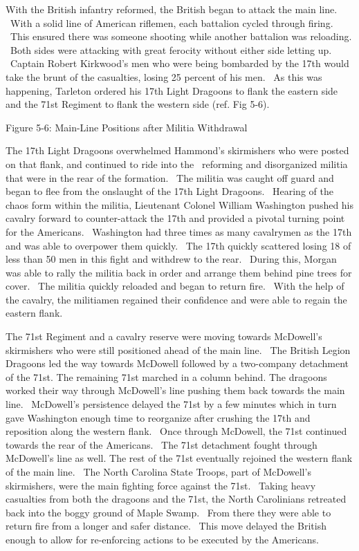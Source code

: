 With the British infantry reformed, the British began to attack the main line.
 With a solid line of American riflemen, each battalion cycled through firing.
 This ensured there was someone shooting while another battalion was reloading.
 Both sides were attacking with great ferocity without either side letting up.
 Captain Robert Kirkwood’s men who were being bombarded by the 17th would take
the brunt of the casualties, losing 25 percent of his men.  As this was
happening, Tarleton ordered his 17th Light Dragoons to flank the eastern side
and the 71st Regiment to flank the western side (ref. Fig 5-6).



Figure 5-6: Main-Line Positions after Militia Withdrawal
\cite[p.102]{babits_devil_2001}





The 17th Light Dragoons overwhelmed Hammond’s skirmishers who were posted on
that flank, and continued to ride into the  reforming and disorganized militia
that were in the rear of the formation.  The militia was caught off guard and
began to flee from the onslaught of the 17th Light Dragoons.  Hearing of the
chaos form within the militia, Lieutenant Colonel William Washington pushed his
cavalry forward to counter-attack the 17th and provided a pivotal turning point
for the Americans.  Washington had three times as many cavalrymen as the 17th
and was able to overpower them quickly.  The 17th quickly scattered losing 18 of
less than 50 men in this fight and withdrew to the rear.  During this, Morgan
was able to rally the militia back in order and arrange them behind pine trees
for cover.  The militia quickly reloaded and began to return fire.  With the
help of the cavalry, the militiamen regained their confidence and were able to
regain the eastern flank.

The 71st Regiment and a cavalry reserve were moving towards McDowell’s
skirmishers who were still positioned ahead of the main line.  The British
Legion Dragoons led the way towards McDowell followed by a two-company
detachment of the 71st.  The remaining 71st marched in a column behind.  The
dragoons worked their way through McDowell’s line pushing them back towards the
main line.  McDowell’s persistence delayed the 71st by a few minutes which in
turn gave Washington enough time to reorganize after crushing the 17th and
reposition along the western flank.  Once through McDowell, the 71st continued
towards the rear of the Americans.  The 71st detachment fought through
McDowell’s line as well.  The rest of the 71st eventually rejoined the western
flank of the main line.  The North Carolina State Troops, part of McDowell’s
skirmishers, were the main fighting force against the 71st.  Taking heavy
casualties from both the dragoons and the 71st, the North Carolinians retreated
back into the boggy ground of Maple Swamp.  From there they were able to return
fire from a longer and safer distance.  This move delayed the British enough to
allow for re-enforcing actions to be executed by the Americans. 

